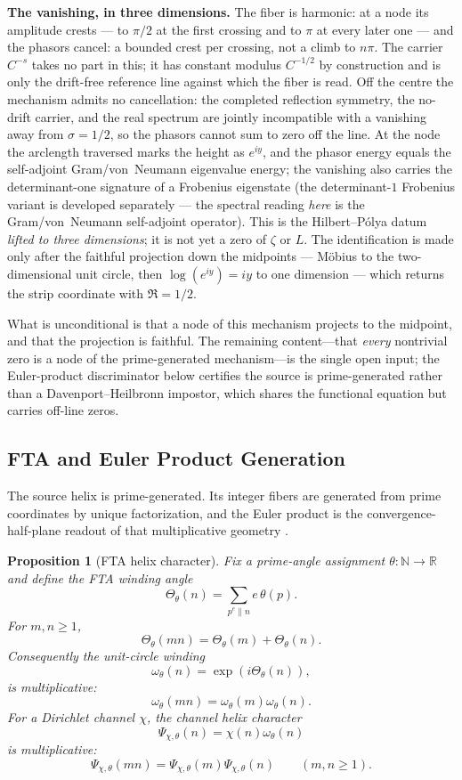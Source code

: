 \documentclass[11pt]{article}
\newtheorem{proposition}[definition]{Proposition}
\begin{document}
\textbf{The vanishing, in three dimensions.}  The fiber is harmonic: at a node
its amplitude crests --- to $\pi/2$ at the first crossing and to $\pi$ at every
later one --- and the phasors cancel: a bounded crest per crossing, not a climb
to $n\pi$.  The carrier $C^{-s}$ takes no part in this; it has constant
modulus $C^{-1/2}$ by construction and is only the drift-free reference line
against which the fiber is read.  Off the centre the mechanism admits no
cancellation: the completed reflection symmetry, the no-drift carrier, and the
real spectrum are jointly incompatible with a vanishing away from $\sigma=1/2$,
so the phasors cannot sum to zero off the line.  At the node the arclength
traversed marks the height as $e^{iy}$, and the phasor energy equals the
self-adjoint Gram/von~Neumann eigenvalue energy; the vanishing also carries the
determinant-one signature of a Frobenius eigenstate (the determinant-$1$
Frobenius variant is developed separately --- the spectral reading \emph{here} is
the Gram/von~Neumann self-adjoint operator).  This is the Hilbert--Pólya datum
\emph{lifted to three dimensions}; it is not yet a zero of $\zeta$ or $L$.  The
identification is made only after the faithful projection down the midpoints ---
Möbius to the two-dimensional unit circle, then $\log(e^{iy})=iy$ to one
dimension --- which returns the strip coordinate with $\Re=1/2$.

What is unconditional is that a node of this mechanism projects to the midpoint,
and that the projection is faithful.  The remaining content---that \emph{every}
nontrivial zero is a node of the prime-generated mechanism---is the single open
input; the Euler-product discriminator below certifies the source is
prime-generated rather than a Davenport--Heilbronn impostor, which shares the
functional equation but carries off-line zeros.

\subsection{FTA and Euler Product Generation}

The source helix is prime-generated.  Its integer fibers are generated from
prime coordinates by unique factorization, and the Euler product is the
convergence-half-plane readout of that multiplicative geometry
\cite{Davenport2000,MontgomeryVaughan2007}.

\begin{proposition}[FTA helix character]
Fix a prime-angle assignment $\theta:\mathbb N\to\mathbb R$ and define the FTA
winding angle
\[
  \Theta_\theta(n)
  =
  \sum_{p^e\parallel n} e\,\theta(p).
\]
For $m,n\ge1$,
\[
  \Theta_\theta(mn)
  =
  \Theta_\theta(m)+\Theta_\theta(n).
\]
Consequently the unit-circle winding
\[
  \omega_\theta(n)=\exp(i\Theta_\theta(n)),
\]
is multiplicative:
\[
  \omega_\theta(mn)=\omega_\theta(m)\omega_\theta(n).
\]
For a Dirichlet channel $\chi$, the channel helix character
\[
  \Psi_{\chi,\theta}(n)=\chi(n)\omega_\theta(n)
\]
is multiplicative:
\[
  \Psi_{\chi,\theta}(mn)
  =
  \Psi_{\chi,\theta}(m)\Psi_{\chi,\theta}(n)
  \qquad(m,n\ge1).
\]
\end{proposition}
\end{document}
